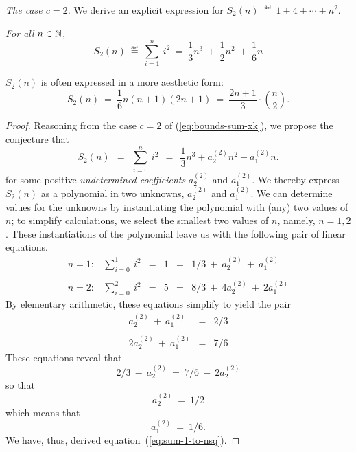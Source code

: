 {\it The case $c=2$.}
%
We derive an explicit expression for $S_2(n) \ \eqdef \  1 + 4 +
\cdots + n^2$.

\begin{prop}
{\em For all} $n \in \mathbb{N}$,
\begin{equation}
\label{eq:sum-1-to-nsq}
S_2(n) \ \eqdef \ \sum_{i=1}^n \ i^2 
 \ = \ \frac{1}{3} n^3 \ + \ \frac{1}{2} n^2 \ + \ \frac{1}{6} n
\end{equation}
\end{prop}

\noindent
$S_2(n)$ is often expressed in a more aesthetic form:
\[ S_2(n) \ = \
\frac{1}{6} n (n+1)(2n+1) \ = \
\frac{2n+1}{3} \cdot {n \choose 2}.
\]

\begin{proof}
Reasoning from the case $c=2$ of (\ref{eq:bounds-sum-xk}), we
propose the conjecture that
\begin{equation}
\label{eq:symbolic-cubic}
S_2(n) \ \ = \ \
\sum_{i=0}^n \ i^2 \ \ = \ \ \frac{1}{3} n^3 + a^{(2)}_2 n^2 + a^{(2)}_1 n.
\end{equation}
for some positive {\it undetermined coefficients} $a^{(2)}_2$ and
$a^{(2)}_1$.  We thereby express $S_2(n)$ as a polynomial in two
unknowns, $a^{(2)}_2$ and $a^{(2)}_1$.  We can determine values for
the unknowns by instantiating the polynomial with (any) two values of
$n$; to simplify calculations, we select the smallest two values of
$n$, namely, $n = 1,2$.  These instantiations of the polynomial leave
us with the following pair of linear equations.
\[
\begin{array}{cccccl}
n=1: & \sum_{i=0}^1 \ i^2
   & = & 1 & = &
1/3 \ + \ a^{(2)}_2 \ + \ a^{(2)}_1 \\
 & & & & & \\
n=2: & \sum_{i=0}^2 \ i^2
   & = & 5 & = &
8/3 \ + \ 4 a^{(2)}_2 \ + \ 2 a^{(2)}_1
\end{array}
\]
By elementary arithmetic, these equations simplify to yield the pair
\[
\begin{array}{ccc}
a^{(2)}_2 \ + \ a^{(2)}_1   & = & 2/3 \\
 & & \\
2 a^{(2)}_2 \ + \ a^{(2)}_1 & = & 7/6
\end{array}
\]
These equations reveal that
\[ 2/3 \ - \ a^{(2)}_2 \ = \ 7/6 \ - \ 2 a^{(2)}_2 \]
so that 
\[ a^{(2)}_2 \ = \ 1/2 \]
which means that
\[ a^{(2)}_1 \ = \ 1/6. \]
We have, thus, derived equation~(\ref{eq:sum-1-to-nsq}).  
\end{proof}


